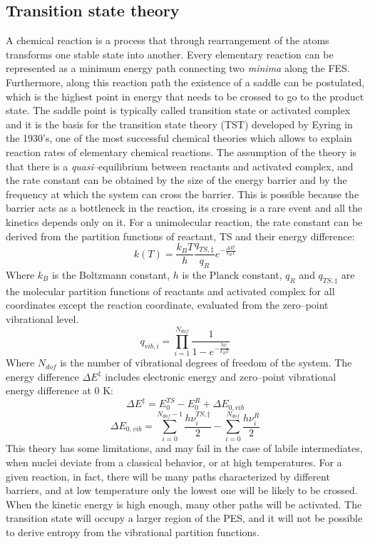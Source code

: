 \subsection*{Transition state theory}
A chemical reaction is a process that through rearrangement of the atoms transforms one stable state into another. Every elementary reaction can be represented as a minimum energy path connecting two \textit{minima} along the FES. Furthermore, along this reaction path the existence of a saddle can be postulated, which is the highest point in energy that needs to be crossed to go to the product state. 
The saddle point is typically called transition state or activated complex and it is the basis for the transition state theory (TST) developed by Eyring in the 1930’s, one of the most successful chemical theories which allows to explain reaction rates of elementary chemical reactions. The assumption of the theory is that there is a \textit{quasi}--equilibrium between reactants and activated complex, and the rate constant can be obtained by the size of the energy barrier and by the frequency at which the system can cross the barrier. This is possible because the barrier acts as a bottleneck in the reaction, its crossing is a rare event and all the kinetics depends only on it. For a unimolecular reaction, the rate constant can be derived from the partition functions of reactant, TS and their energy difference:
\[
k(T) = \dfrac{{k_B T}}{h}
\dfrac{{q_{TS,\ddagger}}}{{q_R}} e^{- \frac{\Delta E^{\ddagger}}{k_B T}}
\]
Where $k_B$ is the Boltzmann constant, $h$ is the Planck constant, $q_R$ and $q_{TS,\ddagger}$ are the molecular partition functions of reactants and activated complex for all coordinates except the reaction coordinate, evaluated from the zero--point vibrational level. 
\[
q_{vib,i} = \prod_{i=1}^{N_{dof}} \dfrac{1}{1 - e^{- \frac{h \nu_{i}}{k_B T}}}
\]
Where $N_{dof}$ is the number of vibrational degrees of freedom of the system. The energy difference $\Delta E^{\ddagger}$ includes electronic energy and zero--point vibrational energy difference at 0 K:
\[
\Delta E^{\ddagger} = E_{0}^{TS} - E_{0}^{R} + \Delta E_{0,vib}
\]
\[
\Delta E_{0,vib} = \sum_{i=0}^{N_{dof}-1} \frac{h \nu_{i}^{TS,\ddagger}}{2}
- \sum_{i=0}^{N_{dof}} \frac{h \nu_{i}^{R}}{2}
\]
This theory has some limitations, and may fail in the case of labile intermediates, when nuclei deviate from a classical behavior, or at high temperatures. For a given reaction, in fact, there will be many paths characterized by different barriers, and at low temperature only the lowest one will be likely to be crossed. When the kinetic energy is high enough, many other paths will be activated. The transition state will occupy a larger region of the PES, and it will not be possible to derive entropy from the vibrational partition functions.

